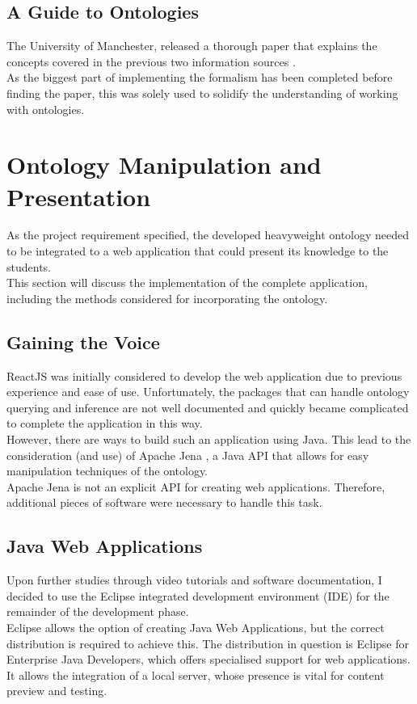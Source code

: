\documentclass[12pt]{report}
\begin{document}
    \subsection{A Guide to Ontologies}
    The University of Manchester, released a thorough paper that explains the concepts covered in the previous two information sources \cite{manchester}.\\
    As the biggest part of implementing the formalism has been completed before finding the paper, this was solely used to solidify the understanding of working with ontologies.
	
	\section{Ontology Manipulation and Presentation}
	As the project requirement specified, the developed heavyweight ontology needed to be integrated to a web application that could present its knowledge to the students.\\
	This section will discuss the implementation of the complete application, including the methods considered for incorporating the ontology.
	\subsection{Gaining the Voice}
	ReactJS was initially considered to develop the web application due to previous experience and ease of use. Unfortunately, the packages that can handle ontology querying and inference are not well documented and quickly became complicated to complete the application in this way.\\
	However, there are ways to build such an application using Java. This lead to the consideration (and use) of Apache Jena \cite{jena}, a Java API that allows for easy manipulation techniques of the ontology.\\
	Apache Jena is not an explicit API for creating web applications. Therefore, additional pieces of software were necessary to handle this task.\\
	
	\subsection{Java Web Applications}
	Upon further studies through video tutorials and software documentation, I decided to use the Eclipse integrated development environment (IDE) for the remainder of the development phase.\\
	Eclipse allows the option of creating Java Web Applications, but the correct distribution is required to achieve this. The distribution in question is Eclipse for Enterprise Java Developers, which offers specialised support for web applications. It allows the integration of a local server, whose presence is vital for content preview and testing.
	
\end{document}
